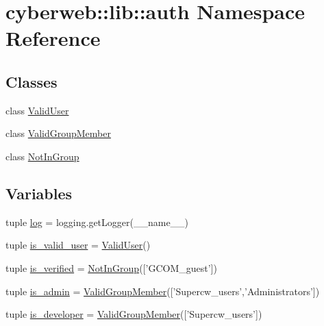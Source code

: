 \hypertarget{namespacecyberweb_1_1lib_1_1auth}{\section{cyberweb\-:\-:lib\-:\-:auth \-Namespace \-Reference}
\label{namespacecyberweb_1_1lib_1_1auth}
}
\subsection*{\-Classes}
\begin{DoxyCompactItemize}
\item 
class \hyperlink{classcyberweb_1_1lib_1_1auth_1_1_valid_user}{\-Valid\-User}
\item 
class \hyperlink{classcyberweb_1_1lib_1_1auth_1_1_valid_group_member}{\-Valid\-Group\-Member}
\item 
class \hyperlink{classcyberweb_1_1lib_1_1auth_1_1_not_in_group}{\-Not\-In\-Group}
\end{DoxyCompactItemize}
\subsection*{\-Variables}
\begin{DoxyCompactItemize}
\item 
tuple \hyperlink{namespacecyberweb_1_1lib_1_1auth_ad1020b1896304cc199e8a3eb9bdac7e9}{log} = logging.\-get\-Logger(\-\_\-\-\_\-name\-\_\-\-\_\-)
\item 
tuple \hyperlink{namespacecyberweb_1_1lib_1_1auth_ad2b3b5f53350ca475a03adbae4755285}{is\-\_\-valid\-\_\-user} = \hyperlink{classcyberweb_1_1lib_1_1auth_1_1_valid_user}{\-Valid\-User}()
\item 
tuple \hyperlink{namespacecyberweb_1_1lib_1_1auth_a33409e23cfbddfbfe913fa47cbc93e56}{is\-\_\-verified} = \hyperlink{classcyberweb_1_1lib_1_1auth_1_1_not_in_group}{\-Not\-In\-Group}(\mbox{[}'\-G\-C\-O\-M\-\_\-guest'\mbox{]})
\item 
tuple \hyperlink{namespacecyberweb_1_1lib_1_1auth_a16da607061c9df3ef1f43e994bfc6d0b}{is\-\_\-admin} = \hyperlink{classcyberweb_1_1lib_1_1auth_1_1_valid_group_member}{\-Valid\-Group\-Member}(\mbox{[}'\-Supercw\-\_\-users','\-Administrators'\mbox{]})
\item 
tuple \hyperlink{namespacecyberweb_1_1lib_1_1auth_a1ffe9d73617d0fea4cae7363b630a86e}{is\-\_\-developer} = \hyperlink{classcyberweb_1_1lib_1_1auth_1_1_valid_group_member}{\-Valid\-Group\-Member}(\mbox{[}'\-Supercw\-\_\-users'\mbox{]})
\end{DoxyCompactItemize}


